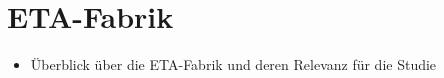\section{ETA-Fabrik}
\label{ch_04ETA-Fabrik}

\begin{itemize}
	\item Überblick über die ETA-Fabrik und deren Relevanz für die Studie
\end{itemize}